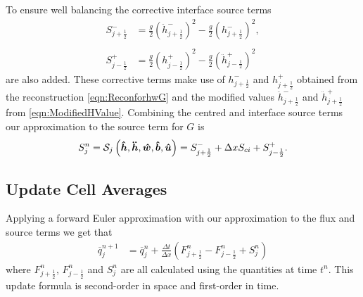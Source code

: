 To ensure well balancing the corrective interface source terms
	\begin{align*}
	 S^{-}_{j + \frac{1}{2}} &=  \frac{g}{2} \left(\ddot{h}^{-}_{j + \frac{1}{2}} \right)^2 - \frac{g}{2} \left(h^{-}_{j + \frac{1}{2}} \right)^2, \\ \\
	  S^{+}_{j - \frac{1}{2}} &=  \frac{g}{2} \left(h^{+}_{j - \frac{1}{2}}\right)^2 - \frac{g}{2}\left(\ddot{h}^{+}_{j - \frac{1}{2}}\right)^2 
	\end{align*}
are also added. These corrective terms make use of $h^{-}_{j + \frac{1}{2}}$ and $h^{+}_{j + \frac{1}{2}}$ obtained from the reconstruction \eqref{eqn:ReconforhwG} and the modified values $\ddot{h}^{-}_{j + \frac{1}{2}}$ and $\ddot{h}^{+}_{j + \frac{1}{2}}$ from \eqref{eqn:ModifiedHValue}. Combining the centred and interface source terms our approximation to the source term for $G$ is 
\begin{equation}
S^n_j = \mathcal{S}_j\left( \boldsymbol{\hat{h}},\boldsymbol{\ddot{h}},\boldsymbol{\hat{w}},\boldsymbol{\hat{b}}, \boldsymbol{\hat{u}}  \right)=   S^{-}_{j + \frac{1}{2}} + \Delta x S_{ci} + S^{+}_{j - \frac{1}{2}}.
\label{eqn:SourceTerm}
\end{equation}


\subsection{Update Cell Averages}
Applying a forward Euler approximation with our approximation to the flux and source terms we get that
\begin{align}
\overline{q}^{n+1}_j &= \overline{q}^{n}_j + \frac{\Delta t}{\Delta x} \left(F^n_{j+\frac{1}{2}} - F^n_{j-\frac{1}{2}} + S^n_j\right)
\label{eqn:UpdateMethod}
\end{align}
where $F^n_{j+\frac{1}{2}}$, $F^n_{j-\frac{1}{2}}$ and $S^n_j$ are all calculated using the quantities at time $t^n$. This update formula is second-order in space and first-order in time.


